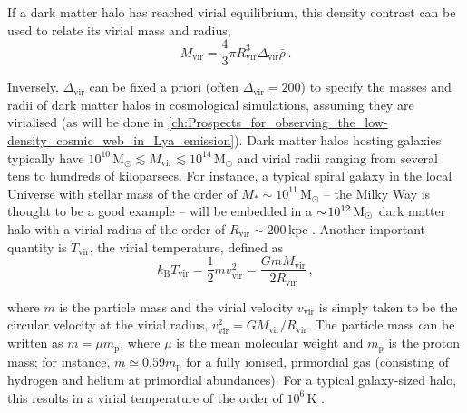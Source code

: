 If a dark matter halo has reached virial equilibrium, this density contrast can be used to relate its virial mass and radius,
\begin{equation}
    \label{chIeq:Virial_mass}
    M_\text{vir} = \frac{4}{3} \pi R_\text{vir}^3 \Delta_\text{vir} \bar{\rho} \, .
\end{equation}

Inversely, $\Delta_\text{vir}$ can be fixed a priori (often $\Delta_\text{vir} = 200$) to specify the masses and radii of dark matter halos in cosmological simulations, assuming they are virialised (as will be done in \cref{ch:Prospects_for_observing_the_low-density_cosmic_web_in_Lya_emission}). Dark matter halos hosting galaxies typically have $10^{10} \, \mathrm{M_\odot} \lesssim M_\text{vir} \lesssim 10^{14} \, \mathrm{M_\odot}$ and virial radii ranging from several tens to hundreds of kiloparsecs. For instance, a typical spiral galaxy in the local Universe with stellar mass of the order of $M_* \sim 10^{11} \, \mathrm{M_\odot}$ -- the Milky Way is thought to be a good example -- will be embedded in a $\sim \! 10^{12} \, \mathrm{M_\odot}$ dark matter halo with a virial radius of the order of $R_\text{vir} \sim 200 \, \mathrm{kpc}$ \citep[e.g.][]{2013ApJ...764L..31K}. Another important quantity is $T_\text{vir}$, the virial temperature, defined as
\begin{equation}
    \label{chIeq:Virial_temperature}
    k_\text{B} T_\text{vir} = \frac{1}{2} m v_\text{vir}^2 = \frac{G m M_\text{vir}}{2 R_\text{vir}} \, ,
\end{equation}

\noindent where $m$ is the particle mass and the virial velocity $v_\text{vir}$ is simply taken to be the circular velocity at the virial radius, $v_\text{vir}^2 = G M_\text{vir} / R_\text{vir}$. The particle mass can be written as $m = \mu m_\text{p}$, where $\mu$ is the mean molecular weight and $m_\text{p}$ is the proton mass; for instance, $m \simeq 0.59 m_\text{p}$ for a fully ionised, primordial gas (consisting of hydrogen and helium at primordial abundances). For a typical galaxy-sized halo, this results in a virial temperature of the order of $10^6 \, \mathrm{K}$ \citep[where, to good approximation, a primordial gas indeed is fully ionised; e.g.][]{2010gfe..book.....M}.

